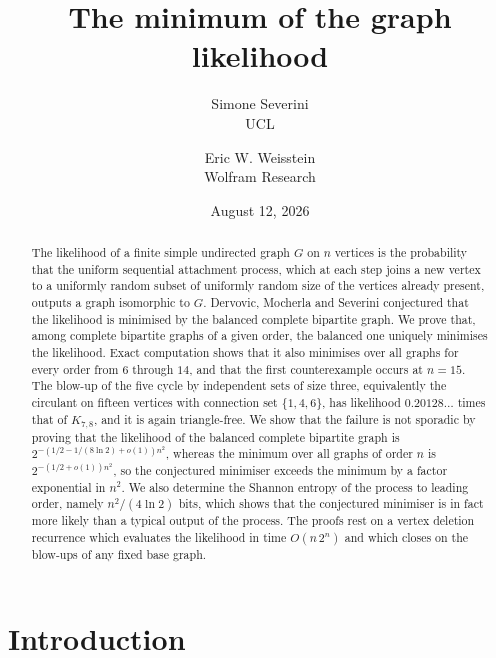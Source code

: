 \documentclass[11pt]{article}
\title{The minimum of the graph likelihood}
\author{
  Simone Severini \\
 UCL
  \and
 Eric W. Weisstein \\
  Wolfram Research
  }
\date{August 12, 2026}
\theoremstyle{definition}
\begin{document}
\maketitle

\begin{abstract}
The likelihood of a finite simple undirected graph $G$ on $n$ vertices is the probability that the uniform sequential
attachment process, which at each step joins a new vertex to a uniformly random subset of
uniformly random size of the vertices already present, outputs a graph isomorphic to $G$.
Dervovic, Mocherla and Severini conjectured that the likelihood is minimised by the balanced
complete bipartite graph. We prove that, among complete bipartite graphs of a given order,
the balanced one uniquely minimises the likelihood. Exact computation shows that
it also minimises over all graphs for every order from $6$ through $14$, and that the first
counterexample occurs at $n=15$. The
blow-up of the five cycle by independent sets of size three, equivalently the circulant on
fifteen vertices with connection set $\{1,4,6\}$, has likelihood
$0.20128\ldots$ times that of $K_{7,8}$, and it is again triangle-free. We show that the failure
is not sporadic by proving that the likelihood of the balanced complete bipartite graph is
$2^{-(1/2-1/(8\ln 2)+o(1))n^2}$, whereas the minimum over all graphs of order $n$ is
$2^{-(1/2+o(1))n^2}$, so the conjectured minimiser exceeds the minimum by a factor exponential
in $n^2$. We also determine the Shannon entropy of the process to leading order, namely
$n^2/(4\ln 2)$ bits, which shows that the conjectured minimiser is in fact more likely than a
typical output of the process. The proofs rest on a vertex deletion recurrence which evaluates
the likelihood in time $O(n\,2^n)$ and which closes on the blow-ups of any fixed base graph.
\end{abstract}

\section{Introduction}
\end{document}
